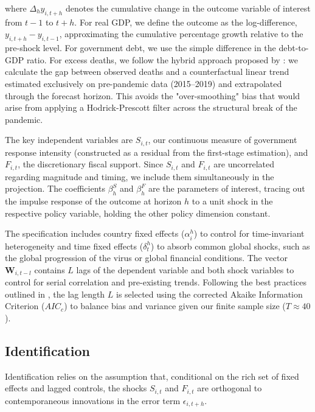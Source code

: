 \documentclass[12pt, a4paper]{article}
\begin{document}
\noindent where $\Delta_h y_{i,t+h}$ denotes the cumulative change in the outcome variable of interest from $t-1$ to $t+h$. For real GDP, we define the outcome as the log-difference, $y_{i,t+h} - y_{i,t-1}$, approximating the cumulative percentage growth relative to the pre-shock level. For government debt, we use the simple difference in the debt-to-GDP ratio. For excess deaths, we follow the hybrid approach proposed by \cite{JordaNechio2023}: we calculate the gap between observed deaths and a counterfactual linear trend estimated exclusively on pre-pandemic data (2015--2019) and extrapolated through the forecast horizon. This avoids the "over-smoothing" bias that would arise from applying a Hodrick-Prescott filter across the structural break of the pandemic.

The key independent variables are $S_{i,t}$, our continuous measure of government response intensity (constructed as a residual from the first-stage estimation), and $F_{i,t}$, the discretionary fiscal support. Since $S_{i,t}$ and $F_{i,t}$ are uncorrelated regarding magnitude and timing, we include them simultaneously in the projection. The coefficients $\beta_h^S$ and $\beta_h^F$ are the parameters of interest, tracing out the impulse response of the outcome at horizon $h$ to a unit shock in the respective policy variable, holding the other policy dimension constant.

The specification includes country fixed effects ($\alpha_i^h$) to control for time-invariant heterogeneity and time fixed effects ($\delta_t^h$) to absorb common global shocks, such as the global progression of the virus or global financial conditions. The vector $\mathbf{W}_{i,t-l}$ contains $L$ lags of the dependent variable and both shock variables to control for serial correlation and pre-existing trends. Following the best practices outlined in \cite{JordaTaylor2025}, the lag length $L$ is selected using the corrected Akaike Information Criterion ($AIC_c$) to balance bias and variance given our finite sample size ($T \approx 40$).

\subsection{Identification}

Identification relies on the assumption that, conditional on the rich set of fixed effects and lagged controls, the shocks $S_{i,t}$ and $F_{i,t}$ are orthogonal to contemporaneous innovations in the error term $\epsilon_{i,t+h}$. 
\end{document}
